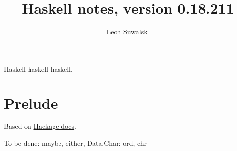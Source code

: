 \documentclass{charun}
\title{Haskell notes, version 0.18.211}
\author{Leon Suwalski}
\begin{document}
\begin{multicols*}{2}
\maketitle
\raggedright
Haskell haskell haskell.
\section{Prelude}
Based on \href{https://hackage.haskell.org/package/base-4.18.0.0/docs/Prelude.html}{Hackage docs}.









To be done: maybe, either, 
Data.Char: ord, chr


\end{multicols*}
\end{document}
